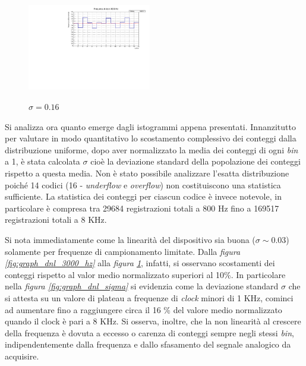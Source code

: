 \documentclass[journal]{IEEEtran}
\begin{document}
\\
\begin{figure}[H]%
\begin{center}


\caption{$\sigma = 0.16$}
\includegraphics[width=0.48\textwidth]{analysis/output/dnl_8_8000hz_bars.pdf}
\label{fig:graph_dnl_8000_hz}

\end{center}
\end{figure}

Si analizza ora quanto emerge dagli istogrammi appena presentati. Innanzitutto per valutare in modo quantitativo lo scostamento complessivo dei conteggi dalla distribuzione uniforme, dopo aver normalizzato la media dei conteggi di ogni \textit{bin} a 1, è stata calcolata $\sigma$ cioè la deviazione standard della popolazione dei conteggi rispetto a questa media. Non è stato possibile analizzare l'esatta distribuzione poiché 14 codici (16 - \textit{underflow} e \textit{overflow}) non costituiscono una statistica sufficiente. La statistica dei conteggi per ciascun codice è invece notevole, in particolare è compresa tra 29684 registrazioni totali a 800 Hz fino a 169517 registrazioni totali a 8 KHz.

Si nota immediatamente come la linearità del dispositivo sia buona ($\sigma \sim 0.03$) solamente per frequenze di campionamento limitate. Dalla \textit{figura \ref{fig:graph_dnl_3000_hz}} alla \textit{figura \ref{fig:graph_dnl_8000_hz}}, infatti, si osservano scostamenti dei conteggi rispetto al valor medio normalizzato superiori al 10\%.
In particolare nella \textit{figura \ref{fig:graph_dnl_sigma}} si evidenzia come la deviazione standard $\sigma$ che si attesta su un valore di plateau a frequenze di \textit{clock} minori di 1 KHz, cominci ad aumentare fino a raggiungere circa il 16 \% del valore medio normalizzato quando il clock è pari a 8 KHz. Si osserva, inoltre, che la non linearità al crescere della frequenza è dovuta a eccesso o carenza di conteggi sempre negli stessi \textit{bin}, indipendentemente dalla frequenza e dallo sfasamento del segnale analogico da acquisire.
\end{document}
